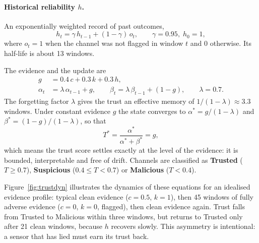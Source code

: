 \paragraph{Historical reliability $h$.} An exponentially weighted record of past outcomes,
\begin{equation}
h_t = \gamma\, h_{t-1} + (1 - \gamma)\, o_t, \qquad \gamma = 0.95,\; h_0 = 1,
\label{eq:h}
\end{equation}
where $o_t = 1$ when the channel was not flagged in window $t$ and $0$ otherwise. Its half-life is about 13 windows.

The evidence and the update are
\begin{align}
g &= 0.4\,c + 0.3\,k + 0.3\,h, \\
\alpha_t &= \lambda\, \alpha_{t-1} + g, \qquad \beta_t = \lambda\, \beta_{t-1} + (1 - g), \qquad \lambda = 0.7.
\label{eq:betaupdate}
\end{align}
The forgetting factor $\lambda$ gives the trust an effective memory of $1/(1 - \lambda) \approx 3.3$ windows. Under constant evidence $g$ the state converges to $\alpha^{*} = g/(1 - \lambda)$ and $\beta^{*} = (1 - g)/(1 - \lambda)$, so that
\begin{equation}
T^{*} = \frac{\alpha^{*}}{\alpha^{*} + \beta^{*}} = g,
\end{equation}
which means the trust score settles exactly at the level of the evidence: it is bounded, interpretable and free of drift. Channels are classified as \textbf{Trusted} ($T \geq 0.7$), \textbf{Suspicious} ($0.4 \leq T < 0.7$) or \textbf{Malicious} ($T < 0.4$).

Figure~\ref{fig:trustdyn} illustrates the dynamics of these equations for an idealised evidence profile: typical clean evidence ($c = 0.5$, $k = 1$), then 45 windows of fully adverse evidence ($c = 0$, $k = 0$, flagged), then clean evidence again. Trust falls from Trusted to Malicious within three windows, but returns to Trusted only after 21 clean windows, because $h$ recovers slowly. This asymmetry is intentional: a sensor that has lied must earn its trust back.

